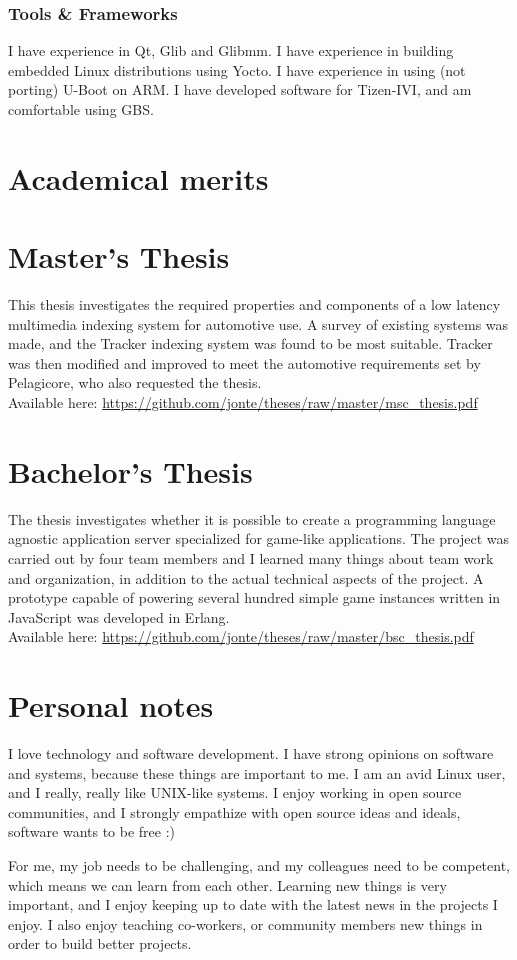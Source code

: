 \documentclass{twocolcv}
\begin{document}
\subsubsection*{Tools \& Frameworks}
I have experience in Qt, Glib and Glibmm. I have experience in building embedded Linux distributions using Yocto. I have experience in using (not porting) U-Boot on ARM. I have developed software for Tizen-IVI, and am comfortable using GBS.

\section*{Academical merits}

\section*{Master's Thesis}
This thesis investigates the required properties and components of a low latency multimedia indexing system for automotive use. A survey of existing systems was made, and the Tracker indexing system was found to be most suitable. Tracker was then modified and improved to meet the automotive requirements set by Pelagicore, who also requested the thesis.
\\
\noindent Available here: \url{https://github.com/jonte/theses/raw/master/msc_thesis.pdf}

\section*{Bachelor's Thesis}
The thesis investigates whether it is possible to create a programming language agnostic application server specialized for game-like applications. The project was carried out by four team members and I learned many things about team work and organization, in addition to the actual technical aspects of the project. A prototype capable of powering several hundred simple game instances written in JavaScript was developed in Erlang.
\\
\noindent Available here: \url{https://github.com/jonte/theses/raw/master/bsc_thesis.pdf}

\section*{Personal notes}
I love technology and software development. I have strong opinions on software and systems, because these things are important to me. I am an avid Linux user, and I really, really like UNIX-like systems. I enjoy working in open source communities, and I strongly empathize with open source ideas and ideals, software wants to be free :)

For me, my job needs to be challenging, and my colleagues need to be competent, which means we can learn from each other. Learning new things is very important, and I enjoy keeping up to date with the latest news in the projects I enjoy. I also enjoy teaching co-workers, or community members new things in order to build better projects.
\end{document}
